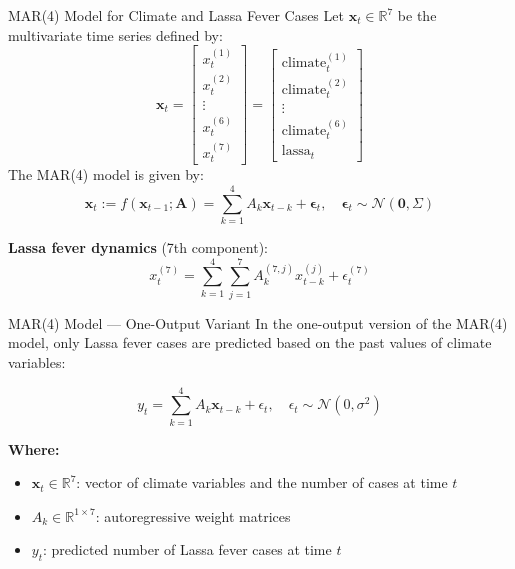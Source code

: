 \documentclass{beamer}
\begin{document}
\begin{frame}{MAR(4) Model for Climate and Lassa Fever Cases}
Let \( \mathbf{x}_t \in \mathbb{R}^7 \) be the multivariate time series defined by:
\[
\mathbf{x}_t = \begin{bmatrix}
x_t^{(1)} \\ x_t^{(2)} \\ \vdots \\ x_t^{(6)} \\ x_t^{(7)}
\end{bmatrix}
= \begin{bmatrix}
\text{climate}_t^{(1)} \\
\text{climate}_t^{(2)} \\
\vdots \\
\text{climate}_t^{(6)} \\
\text{lassa}_t
\end{bmatrix}
\]
The MAR(4) model is given by:
\[
\boxed{
\mathbf{x}_t  := f(\mathbf{x}_{t-1}; \mathbf{A})  = \sum_{k=1}^{4} A_k \mathbf{x}_{t-k} + \boldsymbol{\epsilon}_t, \quad \boldsymbol{\epsilon}_t \sim \mathcal{N}(\mathbf{0}, \Sigma)
}
\]

\small
\textbf{Lassa fever dynamics} (7th component):
\[
x_t^{(7)} = \sum_{k=1}^{4} \sum_{j=1}^{7} A_k^{(7,j)} x_{t-k}^{(j)} + \epsilon_t^{(7)} 
\]
\end{frame}


\begin{frame}{MAR(4) Model — One-Output Variant}
In the one-output version of the MAR(4) model, only Lassa fever cases are predicted based on the past values of climate variables:

\[
\boxed{
y_t = \sum_{k=1}^{4} A_k \mathbf{x}_{t-k} + \epsilon_t, \quad \epsilon_t \sim \mathcal{N}(0, \sigma^2)
}
\]

\smallskip
\textbf{Where:}
\begin{itemize}
    \item \( \mathbf{x}_t \in \mathbb{R}^7 \): vector of climate variables and the number of cases at time \( t \)
    \item \( A_k \in \mathbb{R}^{1 \times 7} \): autoregressive weight matrices
    \item \( y_t \): predicted number of Lassa fever cases at time \( t \)
\end{itemize}
\end{frame}

\end{document}

